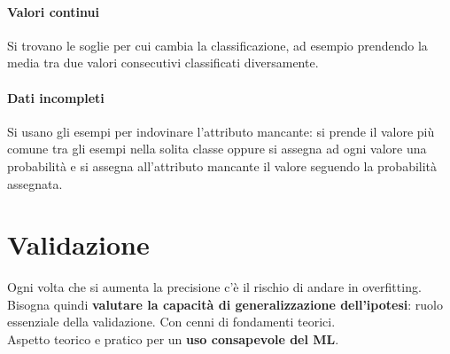 \documentclass[10pt]{book}
\begin{document}
\paragraph{Valori continui} Si trovano le soglie per cui cambia la classificazione, ad esempio prendendo la media tra due valori consecutivi classificati diversamente.
\paragraph{Dati incompleti} Si usano gli esempi per indovinare l'attributo mancante: si prende il valore più comune tra gli esempi nella solita classe oppure si assegna ad ogni valore una probabilità e si assegna all'attributo mancante il valore seguendo la probabilità assegnata.
\section{Validazione}
Ogni volta che si aumenta la precisione c'è il rischio di andare in overfitting. Bisogna quindi \textbf{valutare la capacità di generalizzazione dell'ipotesi}: ruolo essenziale della validazione. Con cenni di fondamenti teorici.\\
Aspetto teorico e pratico per un \textbf{uso consapevole del ML}.
\end{document}
